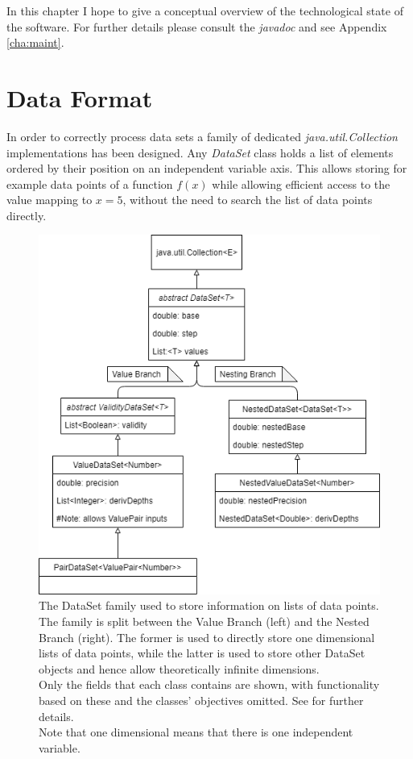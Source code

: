 \documentclass[main.tex]{subfiles}
\begin{document}
  
  In this chapter I hope to give a conceptual overview of the technological state of the software. For further details please consult the \textit{javadoc} and see Appendix \ref{cha:maint}.
  
  \section{Data Format}
    \label{sec:impl:data}
    
    In order to correctly process data sets a family of dedicated \textit{java.util.Collection} implementations has been designed. Any \textit{DataSet} class holds a list of elements ordered by their position on an independent variable axis. This allows storing for example data points of a function $f(x)$ while allowing efficient access to the value mapping to $x=5$, without the need to search the list of data points directly.
    
    \begin{figure}
      \centering
      \includegraphics[width=0.55\linewidth]{figures/dataSetFamily}
      \captionsetup{format=plain, indention=1.0cm}
      \caption{The DataSet family used to store information on lists of data points. The family is split between the Value Branch (left) and the Nested Branch (right). The former is used to directly store one dimensional lists of data points, while the latter is used to store other DataSet objects and hence allow theoretically infinite dimensions. \\
      Only the fields that each class contains are shown, with functionality based on these and the classes' objectives omitted. See  for further details. \\
      Note that one dimensional means that there is one independent variable.}
      \label{fig:dataSetFam}
    \end{figure}
    
\end{document}
